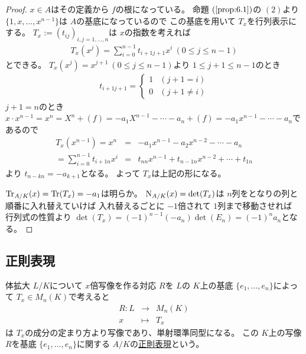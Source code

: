 \documentclass[../master_galois_theory]{subfiles}
\begin{document}
\begin{proof}
  $x \in A$はその定義から $f$の根になっている。
  命題 $(\mathrm{\ref{prop:6.1}})$の $(2)$より
  $\{ 1 , x , \dots , x^{n-1} \}$は $A$の基底になっているので
  この基底を用いて $T_x$を行列表示にする。
  $T_x := (t_{ij})_{i,j = 1 , \dots , n}$は $x$の指数を考えれば
  \begin{eqnarray*}
    T_x(x^j) = \sum_{i=0}^{n-1} t_{i+1 j+1} x^i \  (0 \leq j \leq n-1)
  \end{eqnarray*}
  とできる。
  $T_x(x^j) = x^{j+1} \  (0 \leq j \leq n-1)$より $1 \leq j+1 \leq n-1$のとき
  \begin{eqnarray*}
    t_{i+1 j+1} =
    \begin{cases}
      1 & (j+1 = i) \\
      0 & (j+1 \neq i)
    \end{cases}
  \end{eqnarray*}
  $j+1 = n$のとき $x \cdot x^{n-1} = x^n = X^n + (f) = -a_1 X^{n-1} - \cdots -a_n + (f) = -a_1 x^{n-1} - \cdots -a_n$であるので
  \begin{eqnarray*}
    T_x(x^{n-1}) = x^n & = & -a_1 x^{n-1} -a_2 x^{n-2} - \cdots -a_n \\
    = \sum_{i=0}^{n-1} t_{i+1 n} x^i & = & t_{n n} x^{n-1} + t_{n-1 n} x^{n-2} + \cdots + t_{1 n}
  \end{eqnarray*}
  より $t_{n-k n} = -a_{k+1}$となる。
  よって $T_x$は上記の形になる。

  $\mathrm{Tr}_{A/K}(x) = \mathrm{Tr}(T_x) = -a_1$は明らか。
  $\mathrm{N}_{A/K}(x) = \det(T_x)$は $n$列をとなりの列と順番に入れ替えていけば
  入れ替えるごとに $-1$倍されて $1$列まで移動させれば
  行列式の性質より $\det(T_x) = (-1)^{n-1} (-a_n) \det(E_n) = (-1)^n a_n$となる。
\end{proof}

\subsection{正則表現}

\begin{prop}
  体拡大 $L/K$について
  $x$倍写像を作る対応 $R$を $L$の $K$上の基底 $\{ e_1 , \dots , e_n \}$によって $T_x \in M_n(K)$で考えると
  \begin{eqnarray*}
    R : L & \longrightarrow & M_n(K) \\
    x & \longmapsto & T_x
  \end{eqnarray*}
  は $T_x$の成分の定まり方より写像であり、単射環準同型になる。
  この $K$上の写像 $R$を基底 $\{ e_1 , \dots , e_n \}$に関する
  $A/K$の\underline{正則表現}という。
\end{prop}
\end{document}
